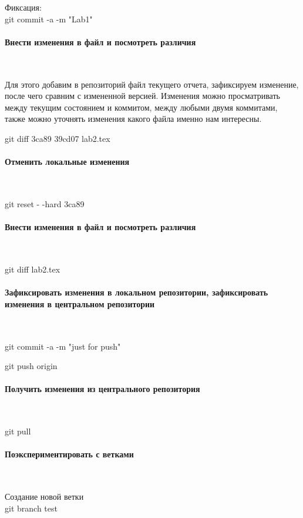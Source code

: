 \documentclass{article}
\begin{document}
Фиксация: \\
git commit -a -m "Lab1" \\

\paragraph{Внести изменения в файл и посмотреть различия}
~

Для этого добавим в репозиторий файл текущего отчета, зафиксируем изменение, после чего сравним с измененной версией. Изменения можно просматривать между текущим состоянием и коммитом, между любыми двумя коммитами, также можно уточнять изменения какого файла именно нам интересны.

git diff 3ca89 39cd07 lab2.tex

\paragraph{Отменить локальные изменения}
~

git reset - -hard 3ca89

\paragraph{Внести изменения в файл и посмотреть различия}
~

git diff lab2.tex

\paragraph{Зафиксировать изменения в локальном репозитории, зафиксировать изменения в центральном репозитории}
~

git commit -a -m "just for push"

git push origin

\paragraph{Получить изменения из центрального репозитория}
~

git pull

\paragraph{Поэкспериментировать с ветками}
~

Создание новой ветки \\
git branch test \\
~
\end{document}
